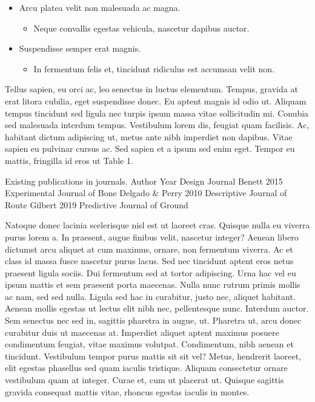 \documentclass[
  12,
]{article}
\providecommand{\tightlist}{%
  \setlength{\itemsep}{0pt}\setlength{\parskip}{0pt}}
\begin{document}
\begin{itemize}
\tightlist
\item
  Arcu platea velit non malesuada ac magna.

  \begin{itemize}
  \tightlist
  \item
    Neque convallis egestas vehicula, nascetur dapibus auctor.\\
  \end{itemize}
\item
  Suspendisse semper erat magnis.

  \begin{itemize}
  \tightlist
  \item
    In fermentum felis et, tincidunt ridiculus est accumsan velit non.
  \end{itemize}
\end{itemize}

Tellus sapien, eu orci ac, leo senectus in luctus elementum. Tempus,
gravida at erat litora cubilia, eget suspendisse donec. Eu aptent magnis
id odio ut. Aliquam tempus tincidunt sed ligula nec turpis ipsum massa
vitae sollicitudin mi. Conubia sed malesuada interdum tempus. Vestibulum
lorem dis, feugiat quam facilisis. Ac, habitant dictum adipiscing ut,
metus ante nibh imperdiet non dapibus. Vitae sapien eu pulvinar cursus
ac. Sed sapien et a ipsum sed enim eget. Tempor eu mattis, fringilla id
eros ut Table 1.

Existing publications in journals. Author Year Design Journal Benett
2015 Experimental Journal of Bone Delgado \& Perry 2010 Descriptive
Journal of Route Gilbert 2019 Predictive Journal of Ground

Natoque donec lacinia scelerisque nisl est ut laoreet cras. Quisque
nulla eu viverra purus lorem a. In praesent, augue finibus velit,
nascetur integer? Aenean libero dictumst arcu aliquet at cum maximus,
ornare, non fermentum viverra. Ac et class id massa fusce nascetur purus
lacus. Sed nec tincidunt aptent eros netus praesent ligula sociis. Dui
fermentum sed at tortor adipiscing. Urna hac vel eu ipsum mattis et sem
praesent porta maecenas. Nulla nunc rutrum primis mollis ac nam, sed sed
nulla. Ligula sed hac in curabitur, justo nec, aliquet habitant. Aenean
mollis egestas ut lectus elit nibh nec, pellentesque nunc. Interdum
auctor. Sem senectus nec sed in, sagittis pharetra in augue, ut.
Pharetra ut, arcu donec curabitur duis ut maecenas at. Imperdiet aliquet
aptent maximus posuere condimentum feugiat, vitae maximus volutpat.
Condimentum, nibh aenean et tincidunt. Vestibulum tempor purus mattis
sit sit vel? Metus, hendrerit laoreet, elit egestas phasellus sed quam
iaculis tristique. Aliquam consectetur ornare vestibulum quam at
integer. Curae et, cum ut placerat ut. Quisque sagittis gravida
consequat mattis vitae, rhoncus egestas iaculis in montes.
\end{document}
